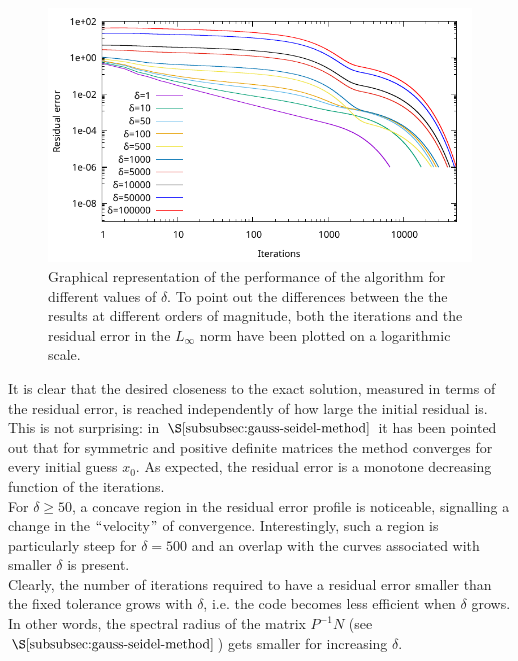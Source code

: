\documentclass[11pt]{article}
\theoremstyle{theorem}
\theoremstyle{definition}
\begin{document}
\begin{figure}[H]
	\begin{center}
		\includegraphics[width=1.0\textwidth]{Gauss_Seidel_delta}
	\end{center}
	\caption{Graphical representation of the performance of the algorithm for different values of $\delta$. To point out the differences between the the results at different orders of magnitude, both the iterations and the residual error in the $L_\infty$ norm have been plotted on a logarithmic scale.
		\label{fig:delta}}
\end{figure} 

It is clear that the desired closeness to the exact solution, measured in terms of the residual error, is reached independently of how large the initial residual is. This is not surprising: in $\S\ref{subsubsec:gauss-seidel-method}$ it has been pointed out that for symmetric and positive definite matrices the method converges for every initial guess $x_0$. As expected, the residual error is a monotone decreasing function of the iterations.\\
For $\delta\ge50$, a concave region in the residual error profile is noticeable, signalling a change in the $``$velocity$"$ of convergence. Interestingly, such a region is particularly steep for $\delta=500$ and an overlap with the curves associated with smaller $\delta$ is present.\\

Clearly, the number of iterations required to have a residual error smaller than the fixed tolerance grows with $\delta$, i.e. the code becomes less efficient when $\delta$ grows. In other words, the spectral radius of the matrix $P^{-1}N$ (see $\S\ref{subsubsec:gauss-seidel-method}$) gets smaller for increasing $\delta$.\\
\end{document}
